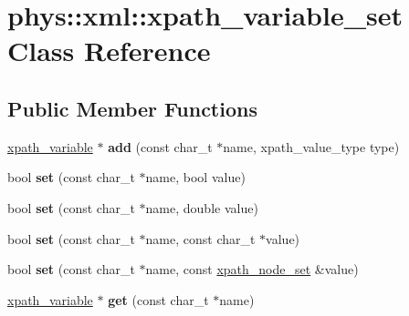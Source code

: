 \hypertarget{classphys_1_1xml_1_1xpath__variable__set}{
\section{phys::xml::xpath\_\-variable\_\-set Class Reference}
\label{d8/d65/classphys_1_1xml_1_1xpath__variable__set}
}
\subsection*{Public Member Functions}
\begin{DoxyCompactItemize}
\item 
\hypertarget{classphys_1_1xml_1_1xpath__variable__set_a4fda302b6bddffabbe60c0478d358b33}{
\hyperlink{classphys_1_1xml_1_1xpath__variable}{xpath\_\-variable} $\ast$ {\bfseries add} (const char\_\-t $\ast$name, xpath\_\-value\_\-type type)}
\label{d8/d65/classphys_1_1xml_1_1xpath__variable__set_a4fda302b6bddffabbe60c0478d358b33}

\item 
\hypertarget{classphys_1_1xml_1_1xpath__variable__set_a9d618a1a15bfbace2c323098a8b43836}{
bool {\bfseries set} (const char\_\-t $\ast$name, bool value)}
\label{d8/d65/classphys_1_1xml_1_1xpath__variable__set_a9d618a1a15bfbace2c323098a8b43836}

\item 
\hypertarget{classphys_1_1xml_1_1xpath__variable__set_a13e7fc9ce7c2b60abce0fed5ad482783}{
bool {\bfseries set} (const char\_\-t $\ast$name, double value)}
\label{d8/d65/classphys_1_1xml_1_1xpath__variable__set_a13e7fc9ce7c2b60abce0fed5ad482783}

\item 
\hypertarget{classphys_1_1xml_1_1xpath__variable__set_a1ef12146849262ce612fe03f89f92d61}{
bool {\bfseries set} (const char\_\-t $\ast$name, const char\_\-t $\ast$value)}
\label{d8/d65/classphys_1_1xml_1_1xpath__variable__set_a1ef12146849262ce612fe03f89f92d61}

\item 
\hypertarget{classphys_1_1xml_1_1xpath__variable__set_a8ede79fe39cb6d836889f5ddbfb84e28}{
bool {\bfseries set} (const char\_\-t $\ast$name, const \hyperlink{classphys_1_1xml_1_1xpath__node__set}{xpath\_\-node\_\-set} \&value)}
\label{d8/d65/classphys_1_1xml_1_1xpath__variable__set_a8ede79fe39cb6d836889f5ddbfb84e28}

\item 
\hypertarget{classphys_1_1xml_1_1xpath__variable__set_a0fbe3b1575987de76bff41b1355922c4}{
\hyperlink{classphys_1_1xml_1_1xpath__variable}{xpath\_\-variable} $\ast$ {\bfseries get} (const char\_\-t $\ast$name)}
\label{d8/d65/classphys_1_1xml_1_1xpath__variable__set_a0fbe3b1575987de76bff41b1355922c4}


\end{DoxyCompactItemize}

